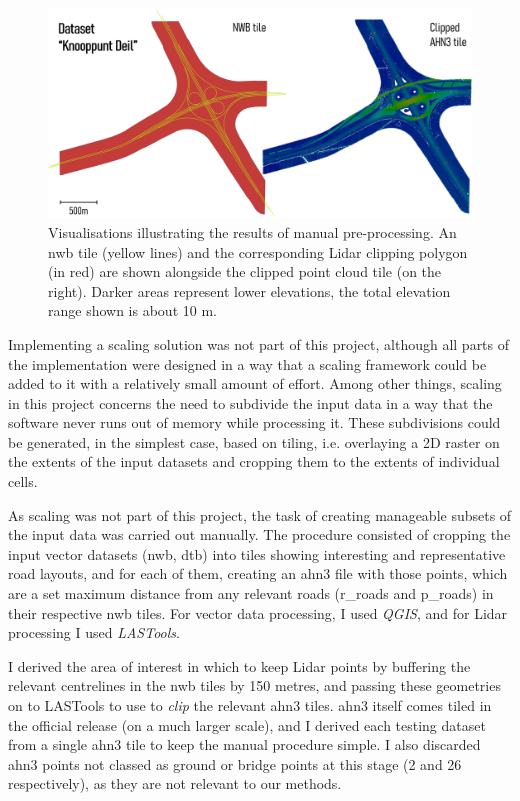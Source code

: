 \begin{figure}
    \centering
    \includegraphics[width=\linewidth]{final_report/figs/manualpreprocessing.png}
    \caption[Visualisations illustrating the results of manual pre-processing]{Visualisations illustrating the results of manual pre-processing. An \ac{nwb} tile (yellow lines) and the corresponding Lidar clipping polygon (in red) are shown alongside the clipped point cloud tile (on the right). Darker areas represent lower elevations, the total elevation range shown is about 10 m.}
    \label{fig:manualpreprocessing}
\end{figure}

Implementing a scaling solution was not part of this project, although all parts of the implementation were designed in a way that a scaling framework could be added to it with a relatively small amount of effort. Among other things, scaling in this project concerns the need to subdivide the input data in a way that the software never runs out of memory while processing it. These subdivisions could be generated, in the simplest case, based on tiling, i.e. overlaying a 2D raster on the extents of the input datasets and cropping them to the extents of individual cells.

As scaling was not part of this project, the task of creating manageable subsets of the input data was carried out manually. The procedure consisted of cropping the input vector datasets (\ac{nwb}, \ac{dtb}) into tiles showing interesting and representative road layouts, and for each of them, creating an \ac{ahn3} file with those points, which are a set maximum distance from any relevant roads (\ac{r_road}s and \ac{p_road}s) in their respective \ac{nwb} tiles. For vector data processing, I used \textit{QGIS}, and for Lidar processing I used \textit{LASTools}.

I derived the area of interest in which to keep Lidar points by buffering the relevant centrelines in the \ac{nwb} tiles by 150 metres, and passing these geometries on to LASTools to use to \textit{clip} the relevant \ac{ahn3} tiles. \ac{ahn3} itself comes tiled in the official release (on a much larger scale), and I derived each testing dataset from a single \ac{ahn3} tile to keep the manual procedure simple. I also discarded \ac{ahn3} points not classed as ground or bridge points at this stage (2 and 26 respectively), as they are not relevant to our methods.

